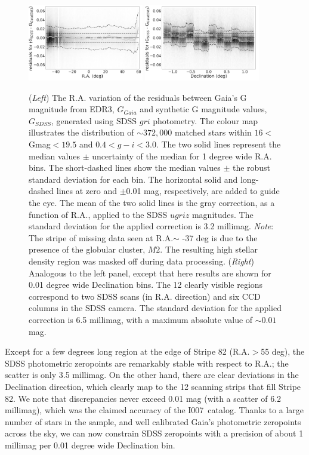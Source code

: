 \documentclass[fleqn,usenatbib]{mnras}
\newcommand{\pOc}{\hbox{I007 catalog}}
\newcommand{\GG}{\hbox{$G_{Gaia}$}}
\newcommand{\GS}{\hbox{$G_{SDSS}$}}
\begin{document}
\begin{figure}
  \centering\includegraphics[width=0.45\textwidth]{figures/GmagCorrection_RA_Hess_lr.png} 
  \centering\includegraphics[width=0.45\textwidth]{figures/GmagCorrection_Dec_Hess_lr.png} 
\caption{({\it Left}) The R.A. variation of the residuals between Gaia's G magnitude from EDR3, \GG
and synthetic G magnitude values, \GS, generated using SDSS $gri$ photometry. The 
colour map illustrates the distribution of $\sim 372,000$ matched stars within 
$16<$Gmag$<19.5$ and $0.4 < g-i < 3.0$. The two solid lines represent the 
median values $\pm$ uncertainty of the median for 1 degree wide R.A. bins. 
The short-dashed lines show the median values $\pm$ the robust standard 
deviation for each bin. The horizontal solid and long-dashed lines at zero and 
$\pm$0.01 mag, respectively, are added to guide the eye. The mean of the two 
solid lines is the gray correction, as a function of R.A., applied to the SDSS 
$ugriz$ magnitudes. The standard deviation for the applied correction is 3.2 millimag. {\it Note}: The stripe of missing data seen at R.A.$\sim$ -37 deg is due to the presence of the globular cluster, $M2$. The resulting high stellar density region was masked off during data processing.
({\it Right}) Analogous to the left panel, except that here results are shown for
0.01 degree wide Declination bins. The 12 clearly visible regions correspond to
two SDSS scans (in R.A. direction) and six CCD columns in the SDSS camera. 
The standard deviation for the applied correction is 6.5 millimag, with a maximum
absolute value of $\sim0.01$ mag.}
\label{fig:graycorrRA}
\end{figure}


Except for a few degrees long region at the edge of Stripe 82 (R.A.$>$55 deg), the
SDSS photometric zeropoints are remarkably stable with respect to R.A.; the scatter
is only 3.5 millimag. On the other hand, there are clear deviations in the Declination 
direction, which clearly map to the 12 scanning strips that fill Stripe 82. We note
that discrepancies never exceed 0.01 mag (with a scatter of 6.2 millimag), which was 
the claimed accuracy of the \pOc. Thanks to a large number of stars in the sample,
and well calibrated Gaia's photometric zeropoints across the sky, we can now 
constrain SDSS zeropoints with a precision of about 1 millimag per 0.01 degree
wide Declination bin. 
\end{document}
